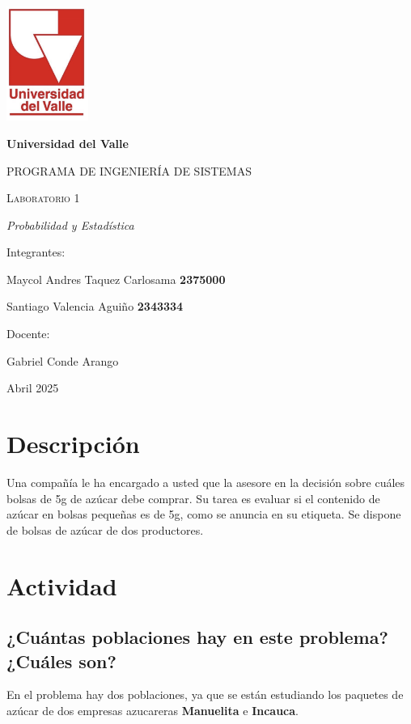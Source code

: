 \documentclass[12pt]{article}
\begin{document}
	\begin{titlepage}
		\centering
		{\includegraphics[width=0.2\textwidth]{img/Logo}\par}
		\vspace{1cm}
		{\bfseries\LARGE Universidad del Valle \par}
		\vspace{1cm}
		{\scshape\Large PROGRAMA DE INGENIERÍA DE SISTEMAS  \par}
		\vspace{1.5cm}
		{\scshape\Huge Laboratorio 1 \par}
		\vspace{1.5cm}
		{\itshape\Large Probabilidad y Estadística \par}
		\vfill
		{\Large Integrantes: \par}
		{\Large Maycol Andres Taquez Carlosama \textbf{2375000} \par}
		{\Large Santiago Valencia Aguiño \textbf{2343334} \par}
		\vfill
		{\Large Docente: \par}
		{\Large Gabriel Conde Arango \par}
		\vfill
		{\Large Abril 2025 \par}
	\end{titlepage} \newpage
	\tableofcontents
	\newpage
	\section{Descripción}  
	Una compañía le ha encargado a usted que la asesore en la decisión sobre cuáles bolsas de 5g de azúcar debe 
	comprar. Su tarea es evaluar si el contenido de azúcar en bolsas pequeñas es de 5g, como se anuncia en su 
	etiqueta. Se dispone de bolsas de azúcar de dos productores. 
	
	\section{Actividad}
	
	\subsection{¿Cuántas poblaciones hay en este problema? ¿Cuáles son? }
	En el problema hay dos poblaciones, ya que se están estudiando los paquetes de azúcar de dos empresas azucareras \textbf{Manuelita} e \textbf{Incauca}.
	
\end{document}
